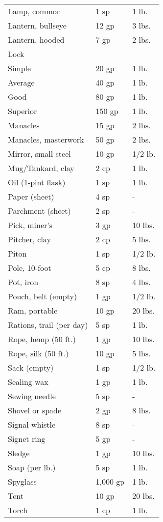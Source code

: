 \begin{table*}[]
\begin{tabular}{lll}
 Lamp, common & 1 sp & 1 lb. \\
 Lantern, bullseye & 12 gp & 3 lbs. \\
 Lantern, hooded & 7 gp & 2 lbs. \\
 Lock  \\
 Simple & 20 gp & 1 lb. \\
 Average & 40 gp & 1 lb. \\
 Good & 80 gp & 1 lb. \\
 Superior & 150 gp & 1 lb. \\
 Manacles & 15 gp & 2 lbs. \\
 Manacles, masterwork & 50 gp & 2 lbs. \\
 Mirror, small steel & 10 gp & 1/2 lb. \\
 Mug/Tankard, clay & 2 cp & 1 lb. \\
 Oil (1-pint flask) & 1 sp & 1 lb. \\
 Paper (sheet) & 4 sp & - \\
 Parchment (sheet) & 2 sp & - \\
 Pick, miner's & 3 gp & 10 lbs. \\
 Pitcher, clay & 2 cp & 5 lbs. \\
 Piton & 1 sp & 1/2 lb. \\
 Pole, 10-foot & 5 cp & 8 lbs. \\
 Pot, iron & 8 sp & 4 lbs. \\
 Pouch, belt (empty) & 1 gp & 1/2 lb. \\
 Ram, portable & 10 gp & 20 lbs. \\
 Rations, trail (per day) & 5 sp & 1 lb. \\
 Rope, hemp (50 ft.) & 1 gp & 10 lbs. \\
 Rope, silk (50 ft.) & 10 gp & 5 lbs. \\
 Sack (empty) & 1 sp & 1/2 lb. \\
 Sealing wax & 1 gp & 1 lb. \\
 Sewing needle & 5 sp & - \\
 Shovel or spade & 2 gp & 8 lbs. \\
 Signal whistle & 8 sp & - \\
 Signet ring & 5 gp & - \\
 Sledge & 1 gp & 10 lbs. \\
 Soap (per lb.) & 5 sp & 1 lb. \\
 Spyglass & 1,000 gp & 1 lb. \\
 Tent & 10 gp & 20 lbs. \\
 Torch & 1 cp & 1 lb. \\

\end{tabular}
\end{table*}

